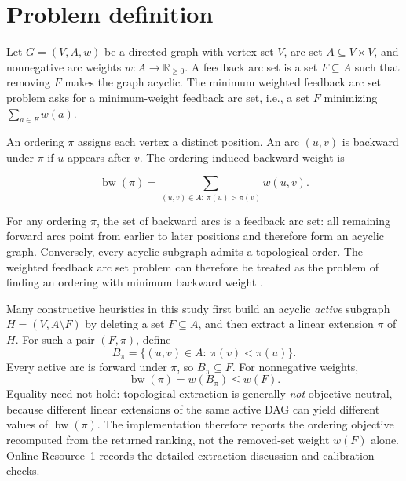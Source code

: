 \section{Problem definition}
\label{sec:problem-definition}

Let \(G=(V,A,w)\) be a directed graph with vertex set \(V\), arc set \(A\subseteq V\times V\), and nonnegative arc weights \(w:A\to \mathbb{R}_{\ge 0}\). A feedback arc set is a set \(F\subseteq A\) such that removing \(F\) makes the graph acyclic. The minimum weighted feedback arc set problem asks for a minimum-weight feedback arc set, i.e., a set \(F\) minimizing \(\sum_{a\in F}w(a)\).

An ordering \(\pi\) assigns each vertex a distinct position. An arc \((u,v)\) is backward under \(\pi\) if \(u\) appears after \(v\). The ordering-induced backward weight is

\begin{equation}
    \operatorname{bw}(\pi)
    =
    \sum_{(u,v)\in A:\ \pi(u)>\pi(v)} w(u,v).
    \label{eq:backward-weight}
\end{equation}

For any ordering \(\pi\), the set of backward arcs is a feedback arc set: all remaining forward arcs point from earlier to later positions and therefore form an acyclic graph. Conversely, every acyclic subgraph admits a topological order. The weighted feedback arc set problem can therefore be treated as the problem of finding an ordering with minimum backward weight \cite{F90,K72}.

Many constructive heuristics in this study first build an acyclic \emph{active} subgraph \(H=(V,A\setminus F)\) by deleting a set \(F\subseteq A\), and then extract a linear extension \(\pi\) of \(H\). For such a pair \((F,\pi)\), define
\begin{equation}
    B_{\pi}
    =
    \{(u,v)\in A:\ \pi(v)<\pi(u)\}.
    \label{eq:backward-set}
\end{equation}
Every active arc is forward under \(\pi\), so \(B_{\pi}\subseteq F\). For nonnegative weights,
\begin{equation}
    \operatorname{bw}(\pi)=w(B_{\pi})\le w(F).
    \label{eq:fas-order-inequality}
\end{equation}
Equality need not hold: topological extraction is generally \emph{not} objective-neutral, because different linear extensions of the same active DAG can yield different values of \(\operatorname{bw}(\pi)\). The implementation therefore reports the ordering objective recomputed from the returned ranking, not the removed-set weight \(w(F)\) alone. Online Resource~1 records the detailed extraction discussion and calibration checks.

